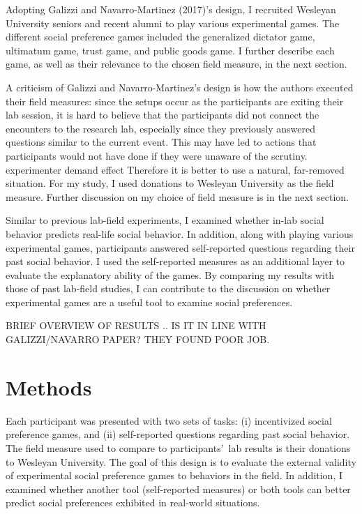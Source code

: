 \documentclass[12pt]{article}
\begin{document}
{\color{red}Adopting Galizzi and Navarro-Martinez (2017)\rq s design}, I recruited Wesleyan University seniors and recent alumni to play various experimental games.  The different social preference games included the generalized dictator game, ultimatum game, trust game, and public goods game. I further describe each game, as well as their relevance to the chosen field measure, in the next section.

A criticism of Galizzi and Navarro-Martinez\rq s design is how the authors executed their field measures: since the setups occur as the participants are exiting their lab session, it is hard to believe that the participants did not connect the encounters to the research lab, especially since they previously answered questions similar to the current event. This may have led to actions that participants would not have done if they were unaware of the scrutiny. {\color{red} experimenter demand effect} Therefore it is better to use a natural, far-removed situation. For my study, I used donations to Wesleyan University as the field measure. Further discussion on my choice of field measure is in the next section.

Similar to previous lab-field experiments, I examined whether in-lab social behavior predicts real-life social behavior. In addition, along with playing various experimental games, participants answered self-reported questions regarding their past social behavior. I used the self-reported measures as an additional layer to evaluate the explanatory ability of the games. {\color{red}By comparing my results with those of past lab-field studies, I can contribute to the discussion on whether experimental games are a useful tool to examine social preferences.}

{\color{red} BRIEF OVERVIEW OF RESULTS .. IS IT IN LINE WITH GALIZZI/NAVARRO PAPER? THEY FOUND POOR JOB. }


\section{Methods}

Each participant was presented with two sets of tasks: (i) incentivized social preference games, and (ii) self-reported questions regarding past social behavior. The field measure used to compare to participants\rq \ lab results is their donations to Wesleyan University. {\color{red}The goal of this design is to evaluate the external validity of experimental social preference games to behaviors in the field. In addition, I examined whether another tool (self-reported measures) or both tools can better predict social preferences exhibited in real-world situations. }
 
\end{document}
